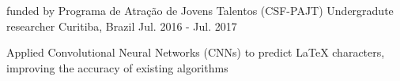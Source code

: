 \begin{cventries}

\cventry
  {funded by Programa de Atração de Jovens Talentos (CSF-PAJT)} %
  {Undergradute researcher} %
  {Curitiba, Brazil} %
  {Jul. 2016 - Jul. 2017} %
  {
    \begin{cvitems} %
        \item {Applied Convolutional Neural Networks (CNNs) to predict LaTeX 
             characters, improving the accuracy of existing algorithms}
    \end{cvitems}
  }

\end{cventries}
